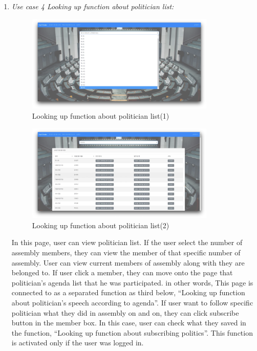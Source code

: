 \documentclass[conference]{IEEEtran}
\begin{document}
\begin{enumerate}
\vspace{100mm}



\item \textit{Use case 4 Looking up function about politician list: } 
\begin{figure}[htbp]
\centerline{\includegraphics[width=90mm,scale=0.5]{fig/usecase6.png}}
\caption{Looking up function about politician list(1)}
\label{fig}
\end{figure}


\begin{figure}[htbp]
\centerline{\includegraphics[width=90mm,scale=0.5]{fig/usecase9.png}}
\caption{Looking up function about politician list(2)}
\label{fig}
\end{figure}

In this page, user can view politician list. If the user select the number of assembly members, they can view the member of that specific number of assembly. User can view current members of assembly along with they are belonged to. If user click a member, they can move onto the page that politician’s agenda list that he was participated. in other words, This page is connected to as a separated function as third below, “Looking up  function about politician’s speech according to agenda”.
If user want to follow specific politician what they did in assembly  on and on, they can click subscribe button in the member box. In this case, user can check what they saved in the function, “Looking up function about subscribing politics”. This function is activated only if the user was logged in.\\


\end{enumerate}
\end{document}
